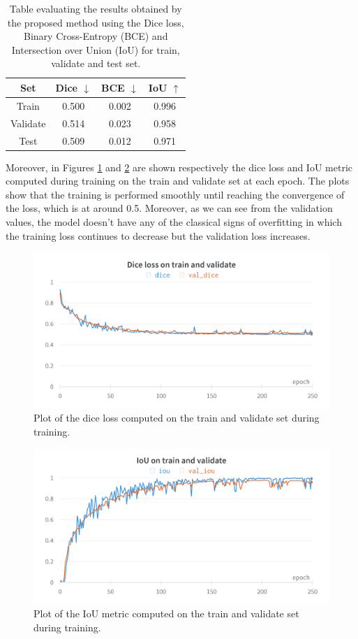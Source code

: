 \documentclass[binding=0.6cm,noexaminfo]{sapthesis}
\begin{document}
\begin{table}[h!]
\centering
\begin{tabular}{|c|c|c|c|}
\hline
Set & Dice $\downarrow$ & BCE $\downarrow$ & IoU $\uparrow$ \\
\hline\hline
Train & 0.500 & 0.002 & 0.996 \\
\hline
Validate & 0.514 & 0.023 & 0.958 \\
\hline
Test & 0.509 & 0.012 & 0.971 \\
\hline
\end{tabular}
\caption{Table evaluating the results obtained by the proposed method using the Dice loss, Binary Cross-Entropy (BCE) and Intersection over Union (IoU) for train, validate and test set.}
\label{tab:results}
\end{table}

Moreover, in Figures \ref{fig:dice} and \ref{fig:iou} are shown respectively the dice loss and IoU metric computed during training on the train and validate set at each epoch. The plots show that the training is performed smoothly until reaching the convergence of the loss, which is at around 0.5. Moreover, as we can see from the validation values, the model doesn't have any of the classical signs of overfitting in which the training loss continues to decrease but the validation loss increases.

\begin{figure}[h!]
\centering
\includegraphics[width=\linewidth]{dice-plot}
\caption{Plot of the dice loss computed on the train and validate set during training.}
\label{fig:dice}
\end{figure}

\begin{figure}[h!]
\centering
\includegraphics[width=\linewidth]{iou-plot}
\caption{Plot of the IoU metric computed on the train and validate set during training.}
\label{fig:iou}
\end{figure}
\end{document}
